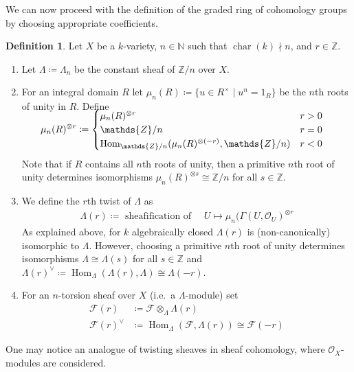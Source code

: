 \documentclass[english]{scrartcl}
\theoremstyle{definition}
\newtheorem{Def}{Definition}[section]
\theoremstyle{remark}
\newcommand*{\N}{\mathds{N}}
\newcommand*{\Z}{\mathds{Z}}
\newcommand*{\Zmod}[1]{\Z/#1} %
\newcommand*{\F}{\mathcal{F}} %
\DeclareMathOperator{\Char}{char} %
\DeclareMathOperator{\Hom}{Hom} %
\newcommand*{\idest}{i.e.\ }
\begin{document}
We can now proceed with the definition of the graded ring of
cohomology groups by choosing appropriate coefficients.
\begin{Def}\label{def:coefficients}
  Let $X$ be a $k$-variety,
  $n\in\N$ such that $\Char(k)\nmid n$,
  and $r\in\Z$.
  \begin{enumerate}
  \item Let $\Lambda\coloneqq\Lambda_n$ be the constant sheaf of
    $\Zmod{n}$ over $X$.
  \item For an integral domain $R$ let
    $\mu_n(R)\coloneqq\{ u\in R^\times\;|\;u^n=1_R\}$ be the $n$th
    roots of unity in $R$. Define
    \begin{align*}
      \SwapAboveDisplaySkip
      \mu_n(R)^{\otimes r} &\coloneqq \begin{cases}
        \mu_n(R)^{\otimes r} &r>0\\
        \Zmod{n} &r=0\\
        \Hom_{\Zmod{n}}(\mu_n(R)^{\otimes (-r)},\Zmod{n}) &r<0
      \end{cases}
    \end{align*}
    Note that if $R$ contains all $n$th roots of unity, then a
    primitive $n$th root of unity determines isomorphisms
    $\mu_n(R)^{\otimes s}\cong\Zmod{n}$ for all $s\in\Z$.
  \item We define the $r$th twist of $\Lambda$ as
    \begin{gather*}
      \Lambda(r) \coloneqq \text{ sheafification of }\quad
      U\mapsto \mu_n(\Gamma(U,\mathcal O_U)^{\otimes r}
    \end{gather*}
    As explained above, for $k$ algebraically closed $\Lambda(r)$ is
    (non-canonically) isomorphic to $\Lambda$.
    However, choosing a primitive $n$th root of unity determines
    isomorphisms $\Lambda\cong\Lambda(s)$ for all $s\in\Z$ and
    $\Lambda(r)^\vee\coloneqq \Hom_\Lambda(\Lambda(r),\Lambda)
    \cong\Lambda(-r)$.
  \item For an $n$-torsion sheaf over $X$ (\idest a $\Lambda$-module)
    set
    \begin{align*}
      \F(r) &\coloneqq \F\otimes_\Lambda \Lambda(r)\\
      \F(r)^\vee &\coloneqq \Hom_\Lambda(\F,\Lambda(r))\cong \F(-r)
    \end{align*}
  \end{enumerate}
\end{Def}

One may notice an analogue of twisting sheaves in sheaf cohomology,
where $\mathcal O_X$-modules are considered.
\end{document}
